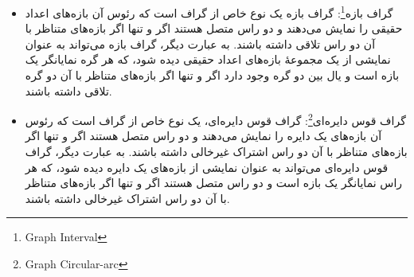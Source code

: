 \documentclass[a4paper,10pt]{article}
\begin{document}
\begin{itemize}
\begin{center}

        \end{center}

        \item گراف بازه\footnote{\hspace{2pt}Graph Interval}: گراف بازه یک نوع خاص از گراف است که رئوس آن بازه‌های اعداد حقیقی را نمایش می‌دهند و دو راس متصل هستند اگر و تنها اگر بازه‌های متناظر با آن دو راس تلاقی داشته باشند. به عبارت دیگر، گراف بازه می‌تواند به عنوان نمایشی از یک مجموعهٔ بازه‌های اعداد حقیقی دیده شود، که هر گره نمایانگر یک بازه است و یال بین دو گره وجود دارد اگر و تنها اگر بازه‌های متناظر با آن دو گره تلاقی داشته باشند.
        
        \item گراف قوس دایره‌ای\footnote{\hspace{2pt}Graph Circular-arc}: گراف قوس دایره‌ای، یک نوع خاص از گراف است که رئوس آن بازه‌های یک دایره را نمایش می‌دهند و دو راس متصل هستند اگر و تنها اگر بازه‌های متناظر با آن دو راس اشتراک غیرخالی داشته باشند. به عبارت دیگر، گراف قوس دایره‌ای می‌تواند به عنوان نمایشی از بازه‌های یک دایره دیده شود، که هر راس نمایانگر یک بازه است و دو راس متصل هستند اگر و تنها اگر بازه‌های متناظر با آن دو راس اشتراک غیرخالی داشته باشند.
        

\end{itemize}
\end{document}
